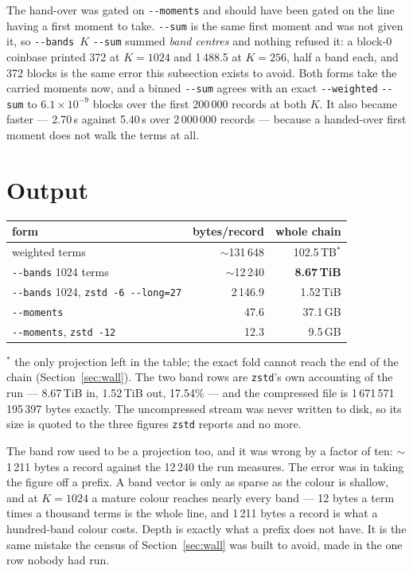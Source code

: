 \documentclass[11pt,a4paper]{article}
\newcommand{\flag}[1]{\texttt{-{}-#1}}
\begin{document}
The hand-over was gated on \flag{moments} and should have been gated on the line
having a first moment to take. \flag{sum} is the same first moment and was not
given it, so \flag{bands}~$K$ \flag{sum} summed \emph{band centres} and nothing
refused it: a block-0 coinbase printed 372 at $K = 1024$ and 1\,488.5 at
$K = 256$, half a band each, and 372 blocks is the same error this subsection
exists to avoid. Both forms take the carried moments now, and a binned
\flag{sum} agrees with an exact \flag{weighted} \flag{sum} to
$6.1\times10^{-9}$ blocks over the first 200\,000 records at both $K$. It also
became faster --- 2.70\,s against 5.40\,s over 2\,000\,000 records --- because a
handed-over first moment does not walk the terms at all.

\section{Output}
\label{sec:output}

\begin{center}
\begin{tabular}{lrr}
\toprule
form & bytes/record & whole chain \\
\midrule
weighted terms                & $\sim$131\,648 & 102.5\,TB$^\ast$ \\
\flag{bands} 1024 terms       & $\sim$12\,240  & \textbf{8.67\,TiB} \\
\flag{bands} 1024, \texttt{zstd -6 -{}-long=27} & 2\,146.9 & 1.52\,TiB \\
\flag{moments}                & 47.6           & 37.1\,GB \\
\flag{moments}, \texttt{zstd -12} & 12.3       & 9.5\,GB \\
\bottomrule
\end{tabular}
\end{center}

\noindent$^\ast$ the only projection left in the table; the exact fold cannot
reach the end of the chain (Section~\ref{sec:wall}). The two band rows are
\texttt{zstd}'s own accounting of the run --- 8.67\,TiB in, 1.52\,TiB out,
17.54\% --- and the compressed file is 1\,671\,571\,195\,397 bytes exactly. The
uncompressed stream was never written to disk, so its size is quoted to the
three figures \texttt{zstd} reports and no more.

The band row used to be a projection too, and it was wrong by a factor of ten:
$\sim$1\,211 bytes a record against the 12\,240 the run measures. The error was
in taking the figure off a prefix. A band vector is only as sparse as the colour
is shallow, and at $K = 1024$ a mature colour reaches nearly every band --- 12
bytes a term times a thousand terms is the whole line, and 1\,211 bytes a record
is what a hundred-band colour costs. Depth is exactly what a prefix does not
have. It is the same mistake the census of Section~\ref{sec:wall} was built to
avoid, made in the one row nobody had run.
\end{document}
